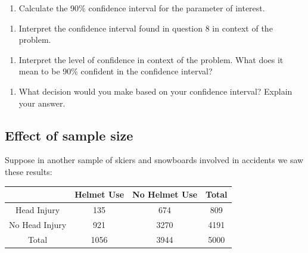 \documentclass[
]{report}
\providecommand{\tightlist}{%
  \setlength{\itemsep}{0pt}\setlength{\parskip}{0pt}}
\begin{document}
\begin{enumerate}
\def\labelenumi{\arabic{enumi}.}
\setcounter{enumi}{7}
\tightlist
\item
  Calculate the 90\% confidence interval for the parameter of interest.
\end{enumerate}

\vspace{0.8in}

\begin{enumerate}
\def\labelenumi{\arabic{enumi}.}
\setcounter{enumi}{8}
\tightlist
\item
  Interpret the confidence interval found in question 8 in context of the problem.
\end{enumerate}

\vspace{0.8in}

\begin{enumerate}
\def\labelenumi{\arabic{enumi}.}
\setcounter{enumi}{9}
\tightlist
\item
  Interpret the level of confidence in context of the problem. What does it mean to be 90\% confident in the confidence interval?
\end{enumerate}

\vspace{0.8in}

\begin{enumerate}
\def\labelenumi{\arabic{enumi}.}
\setcounter{enumi}{10}
\tightlist
\item
  What decision would you make based on your confidence interval? Explain your answer.
  \vspace{0.5in}
\end{enumerate}

\hypertarget{effect-of-sample-size-1}{%
\subsection{Effect of sample size}\label{effect-of-sample-size-1}}

Suppose in another sample of skiers and snowboards involved in accidents we saw these results:

\begin{longtable}[]{@{}cccc@{}}
\toprule
& Helmet Use & No Helmet Use & Total \\
\midrule
\endhead
Head Injury & 135 & 674 & 809 \\
No Head Injury & 921 & 3270 & 4191 \\
Total & 1056 & 3944 & 5000 \\
\bottomrule
\end{longtable}
\end{document}
